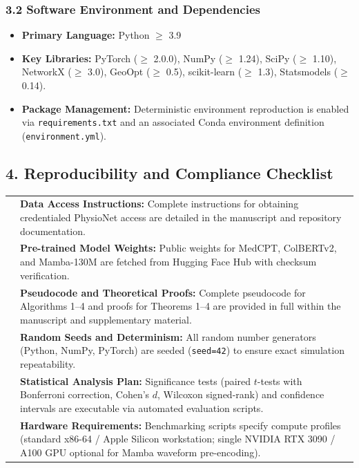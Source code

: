 \documentclass[10pt, letterpaper]{article}
\newcommand{\checkedbox}{\rlap{$\square$}{\raisebox{1pt}{\hspace{1pt}\footnotesize$\checkmark$}}\hspace{2pt}}
\begin{document}
\subsubsection*{3.2 Software Environment and Dependencies}
\begin{itemize}\setlength{\itemsep}{0.5pt}\setlength{\parskip}{0pt}
    \item \textbf{Primary Language:} Python $\ge$ 3.9
    \item \textbf{Key Libraries:} PyTorch ($\ge$ 2.0.0), NumPy ($\ge$ 1.24), SciPy ($\ge$ 1.10), NetworkX ($\ge$ 3.0), GeoOpt ($\ge$ 0.5), scikit-learn ($\ge$ 1.3), Statsmodels ($\ge$ 0.14).
    \item \textbf{Package Management:} Deterministic environment reproduction is enabled via \texttt{requirements.txt} and an associated Conda environment definition (\texttt{environment.yml}).
\end{itemize}

\newpage

\subsection*{4. Reproducibility and Compliance Checklist}

\noindent
\begin{tabular}{@{}c p{}@{}}
    \checkedbox & \textbf{Data Access Instructions:} Complete instructions for obtaining credentialed PhysioNet access are detailed in the manuscript and repository documentation. \\[5pt]
    \checkedbox & \textbf{Pre-trained Model Weights:} Public weights for MedCPT, ColBERTv2, and Mamba-130M are fetched from Hugging Face Hub with checksum verification. \\[5pt]
    \checkedbox & \textbf{Pseudocode and Theoretical Proofs:} Complete pseudocode for Algorithms 1--4 and proofs for Theorems 1--4 are provided in full within the manuscript and supplementary material. \\[5pt]
    \checkedbox & \textbf{Random Seeds and Determinism:} All random number generators (Python, NumPy, PyTorch) are seeded (\texttt{seed=42}) to ensure exact simulation repeatability. \\[5pt]
    \checkedbox & \textbf{Statistical Analysis Plan:} Significance tests (paired $t$-tests with Bonferroni correction, Cohen's $d$, Wilcoxon signed-rank) and confidence intervals are executable via automated evaluation scripts. \\[5pt]
    \checkedbox & \textbf{Hardware Requirements:} Benchmarking scripts specify compute profiles (standard x86-64 / Apple Silicon workstation; single NVIDIA RTX 3090 / A100 GPU optional for Mamba waveform pre-encoding). \\
\end{tabular}
\end{document}
